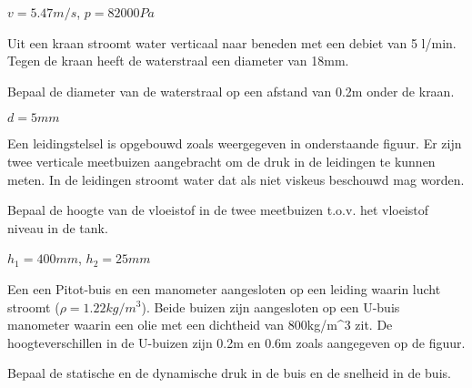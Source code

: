 	\begin{antwoord}
		$v = \unit{5.47}{m/s}$, $p = \unit{82000}{Pa}$
	\end{antwoord}
	\begin{toepassing*}
		\label{waterkraan}
Uit een kraan stroomt water verticaal naar beneden met een debiet van 5 l/min. Tegen de kraan heeft de waterstraal een diameter van 18mm. 

Bepaal de diameter van de waterstraal op een afstand van 0.2m onder de kraan.
		\begin{center}
			
		\end{center}
	\end{toepassing*}
	\begin{antwoord}
		$d = \unit{5}{mm}$
	\end{antwoord}
	\begin{toepassing}
		\label{drukhoogte}
Een leidingstelsel is opgebouwd zoals weergegeven in onderstaande figuur. Er zijn twee verticale meetbuizen aangebracht om de druk in de leidingen te kunnen meten. In de leidingen stroomt water dat als niet viskeus beschouwd mag worden.
		
Bepaal de hoogte van de vloeistof in de twee meetbuizen t.o.v. het vloeistof niveau in de tank.
		\begin{center}
			
		\end{center}
	\end{toepassing}
	\begin{antwoord}
		$h_1 = \unit{400}{mm}$, $h_2 = \unit{25}{mm}$
	\end{antwoord}
	\begin{toepassing}
		\label{dynamische_druk}
Een een Pitot-buis en een manometer aangesloten op een leiding waarin lucht stroomt ($\rho=\unit{1.22}{kg/m^3}$). Beide buizen zijn aangesloten op een U-buis manometer waarin een olie met een dichtheid van \unit{800}{kg/m^3} zit. De hoogteverschillen in de U-buizen zijn 0.2m en 0.6m zoals aangegeven op de figuur.

Bepaal de statische en de dynamische druk in de buis en de snelheid in de buis.
		\begin{center}
			
		\end{center}
	\end{toepassing}
